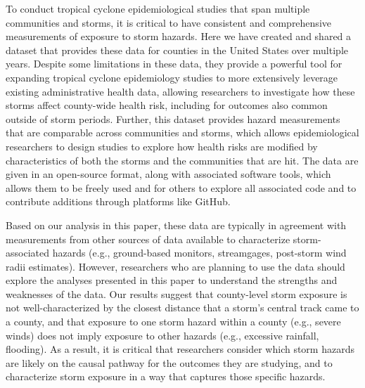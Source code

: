 To conduct tropical cyclone epidemiological studies that span multiple
communities and storms, it is critical to have consistent and comprehensive
measurements of exposure to storm hazards. Here we have created and shared a
dataset that provides these data for counties in the United States over
multiple years. Despite some limitations in these data, they provide a powerful
tool for expanding tropical cyclone epidemiology studies to more extensively
leverage existing administrative health data, allowing researchers to
investigate how these storms affect county-wide health risk, including for
outcomes also common outside of storm periods.  Further, this dataset provides
hazard measurements that are comparable across communities and storms, which
allows epidemiological researchers to design studies to explore how health
risks are modified by characteristics of both the storms and the communities
that are hit. The data are given in an open-source format, along with
associated software tools, which allows them to be freely used and for others
to explore all associated code and to contribute additions through platforms
like GitHub.

Based on our analysis in this paper, these data are typically in agreement with
measurements from other sources of data available to characterize
storm-associated hazards (e.g., ground-based monitors, streamgages, post-storm
wind radii estimates).  However, researchers who are planning to use the data
should explore the analyses presented in this paper to understand the strengths
and weaknesses of the data.  Our results suggest that county-level storm
exposure is not well-characterized by the closest distance that a storm's
central track came to a county, and that exposure to one storm hazard within a
county (e.g., severe winds) does not imply exposure to other hazards (e.g.,
excessive rainfall, flooding). As a result, it is critical that researchers
consider which storm hazards are likely on the causal pathway for the outcomes
they are studying, and to characterize storm exposure in a way that captures
those specific hazards. 
